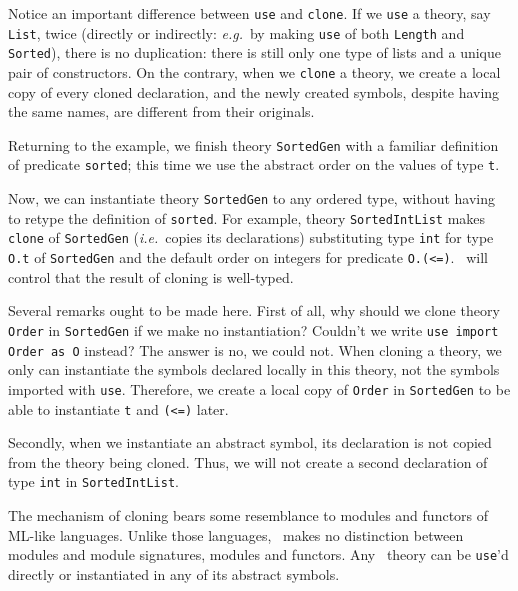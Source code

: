 Notice an important difference between \texttt{use}
and \texttt{clone}. If we \texttt{use} a theory, say
\texttt{List}, twice (directly or indirectly: \emph{e.g.}~by
making \texttt{use} of both \texttt{Length} and
\texttt{Sorted}), there is no duplication: there is
still only one type of lists and a unique pair
of constructors. On the contrary, when we \texttt{clone}
a theory, we create a local copy of every cloned
declaration, and the newly created symbols, despite
having the same names, are different from their originals.

Returning to the example, we finish theory \texttt{SortedGen}
with a familiar definition of predicate \texttt{sorted};
this time we use the abstract order on the values of type
\texttt{t}.

Now, we can instantiate theory \texttt{SortedGen} to any
ordered type, without having to retype the definition of
\texttt{sorted}. For example, theory \texttt{SortedIntList}
makes \texttt{clone} of \texttt{SortedGen} (\emph{i.e.}~copies its
declarations) substituting type \texttt{int} for type
\texttt{O.t} of \texttt{SortedGen} and the default order
on integers for predicate \texttt{O.(<=)}. \why\ will
control that the result of cloning is well-typed.

Several remarks ought to be made here. First of all, why should
we clone theory \texttt{Order} in \texttt{SortedGen} if we make
no instantiation? Couldn't we write \texttt{use import Order as O}
instead? The answer is no, we could not. When cloning a theory,
we only can instantiate the symbols declared locally in this theory,
not the symbols imported with \texttt{use}. Therefore, we create
a local copy of \texttt{Order} in \texttt{SortedGen} to be able
to instantiate \texttt{t} and \texttt{(<=)} later.

Secondly, when we instantiate an abstract symbol, its declaration
is not copied from the theory being cloned. Thus, we will not create
a second declaration of type \texttt{int} in \texttt{SortedIntList}.

The mechanism of cloning bears some resemblance to modules and functors
of ML-like languages. Unlike those languages, \why\ makes no distinction
between modules and module signatures, modules and functors. Any \why\
theory can be \texttt{use}'d directly or instantiated in any of its
abstract symbols.

